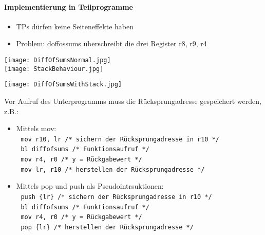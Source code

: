 		\paragraph{Implementierung in Teilprogramme}
		\begin{itemize}
			\item TPs dürfen keine Seiteneffekte haben
			\item Problem: doffossums überschreibt die drei Register r8, r9, r4
		\end{itemize}
		\begin{minipage}{0.5\textwidth}
			\texttt{[image: DiffOfSumsNormal.jpg]} \\ 
			\texttt{[image: StackBehaviour.jpg]}
		\end{minipage}
		\begin{minipage}{0.45\textwidth}
			\texttt{[image: DiffOfSumsWithStack.jpg]}
		\end{minipage}
		\vspace{0.2cm}

		Vor Aufruf des Unterprogramms muss die Rücksprungadresse gespeichert werden, z.B.:
		\begin{itemize}
			\item Mittels mov: \\
					\textcolor{white}{.} \hspace{0.2cm} \texttt{mov r10, lr /* sichern der Rücksprungadresse in r10 */} \\
					\textcolor{white}{.} \hspace{0.2cm} \texttt{bl diffofsums /* Funktionsaufruf */} \\
					\textcolor{white}{.} \hspace{0.2cm} \texttt{mov r4, r0 /* y = Rückgabewert */} \\
					\textcolor{white}{.} \hspace{0.2cm} \texttt{mov lr, r10 /* herstellen der Rücksprungadresse */}
			\item Mittels pop und push als Pseudointrsuktionen: \\
					\textcolor{white}{.} \hspace{0.2cm} \texttt{push \{lr\} /* sichern der Rücksprungadresse in r10 */} \\
					\textcolor{white}{.} \hspace{0.2cm} \texttt{bl diffofsums /* Funktionsaufruf */} \\
					\textcolor{white}{.} \hspace{0.2cm} \texttt{mov r4, r0 /* y = Rückgabewert */} \\
					\textcolor{white}{.} \hspace{0.2cm} \texttt{pop \{lr\} /* herstellen der Rücksprungadresse */}
		\end{itemize}



